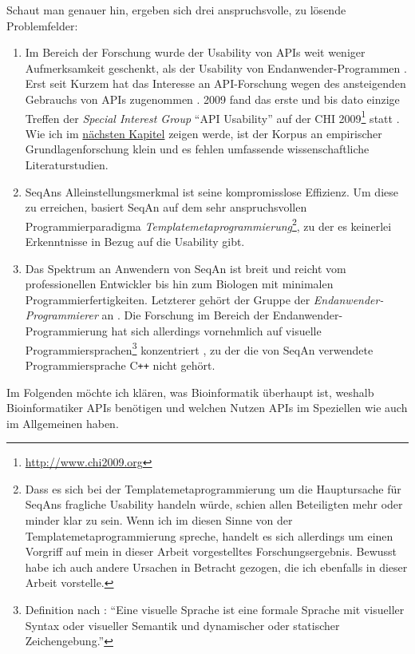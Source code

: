 Schaut man genauer hin, ergeben sich drei anspruchsvolle, zu lösende Problemfelder:
\begin{enumerate}
  \item Im Bereich der Forschung wurde der Usability von APIs weit weniger Aufmerksamkeit geschenkt, als der Usability von Endanwender-Programmen \citep{Grill:2012jm}. Erst seit Kurzem hat das Interesse an API-Forschung wegen des ansteigenden Gebrauchs von APIs zugenommen \citep{Daughtry:2009be}. 2009 fand das erste und bis dato einzige Treffen der \textit{Special Interest Group} ``API Usability'' auf der CHI 2009\footnote{\url{http://www.chi2009.org}} statt \citep{Daughtry:2009dv}. Wie ich im \hyperref[sec:forschungsstand]{nächsten Kapitel} zeigen werde, ist der Korpus an empirischer Grundlagenforschung klein und es fehlen umfassende wissenschaftliche Literaturstudien.
  \item SeqAns Alleinstellungsmerkmal ist seine kompromisslose Effizienz. Um diese zu erreichen, basiert SeqAn auf dem sehr anspruchsvollen Programmierparadigma \textit{Templatemetaprogrammierung}\footnote{Dass es sich bei der Templatemetaprogrammierung um die Hauptursache für SeqAns fragliche Usability handeln würde, schien allen Beteiligten mehr oder minder klar zu sein. Wenn ich im diesen Sinne von der Templatemetaprogrammierung spreche, handelt es sich allerdings um einen Vorgriff auf mein in dieser Arbeit vorgestelltes Forschungsergebnis. Bewusst habe ich auch andere Ursachen in Betracht gezogen, die ich ebenfalls in dieser Arbeit vorstelle.}, zu der es keinerlei Erkenntnisse in Bezug auf die Usability gibt.
  \item Das Spektrum an Anwendern von SeqAn ist breit und reicht vom professionellen Entwickler bis hin zum Biologen mit minimalen Programmierfertigkeiten. Letzterer gehört der Gruppe der \textit{Endanwender-Programmierer} an \citep{Tisdall:2001td}. Die Forschung im Bereich der Endanwender-Programmierung hat sich allerdings vornehmlich auf visuelle Programmiersprachen\footnote{Definition nach \cite{schiffer1998visuelle}: ``Eine visuelle Sprache ist eine formale Sprache mit visueller Syntax oder visueller Semantik und dynamischer oder statischer Zeichengebung.''} konzentriert \citep{Ko:2011el,Gieselmann:-Uisl6hs}, zu der die von SeqAn verwendete Programmiersprache C{}\verb!++! nicht gehört.
\end{enumerate}

Im Folgenden möchte ich klären, was Bioinformatik überhaupt ist, weshalb Bioinformatiker APIs benötigen und welchen Nutzen APIs im Speziellen wie auch im Allgemeinen haben. 



